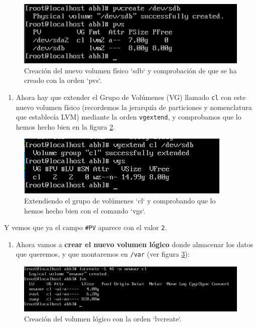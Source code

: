 \documentclass[
]{book}
\providecommand{\tightlist}{%
  \setlength{\itemsep}{0pt}\setlength{\parskip}{0pt}}
\begin{document}
\begin{figure}

{\centering \includegraphics[width=0.7\linewidth]{images/d} 

}

\caption{Creación del nuevo volumen físico `sdb` y comprobación de que se ha creado con la orden `pvs`.}\label{fig:d}
\end{figure}

\begin{enumerate}
\def\labelenumi{\arabic{enumi}.}
\setcounter{enumi}{4}
\tightlist
\item
  Ahora hay que extender el Grupo de Volúmenes (VG) llamado \texttt{cl} con este nuevo volumen físico (recordemos la jerarquía de particiones y nomenclatura que establecía LVM) mediante la orden \texttt{vgextend}, y comprobamos que lo hemos hecho bien en la figura \ref{fig:e}.
\end{enumerate}

\begin{figure}

{\centering \includegraphics[width=0.7\linewidth]{images/e} 

}

\caption{Extendiendo el grupo de volúmenes `cl` y comprobando que lo hemos hecho bien con el comando `vgs`.}\label{fig:e}
\end{figure}

Y vemos que ya el campo \texttt{\#PV} aparece con el valor \texttt{2}.

\begin{enumerate}
\def\labelenumi{\arabic{enumi}.}
\setcounter{enumi}{5}
\tightlist
\item
  Ahora vamos a \textbf{crear el nuevo volumen lógico} donde almacenar los datos que queremos, y que montaremos en \texttt{/var} (ver figura \ref{fig:f}):
\end{enumerate}

\begin{figure}

{\centering \includegraphics[width=0.9\linewidth]{images/f} 

}

\caption{Creación del volumen lógico con la orden `lvcreate`.}\label{fig:f}
\end{figure}
\end{document}
